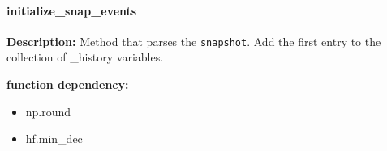 \paragraph{initialize\_snap\_events}\hfill\break
\noindent\textbf{Description:} Method that parses the \texttt{snapshot}. Add the first entry to the collection of \_history variables. 

\textbf{function dependency:}
\begin{itemize}
	\item np.round
	\item hf.min\_dec
\end{itemize}
